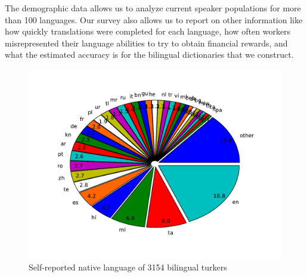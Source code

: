 \documentclass[11pt]{article}
\begin{document}
The demographic data allows us to analyze current speaker populations for more than 100 languages.  Our survey also allows us to report on other information like how quickly translations were completed for each language, how often workers misrepresented their language abilities to try to obtain financial rewards, and what the estimated accuracy is for the bilingual dictionaries that we construct. 


\begin{figure}[h]
\centering
\includegraphics[width=7in]{figures/natlang-pie}
\caption{Self-reported native language of 3154 bilingual turkers}
\label{lang-pie}
\end{figure}
\end{document}
